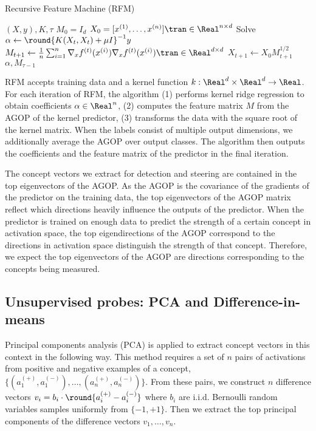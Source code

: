\begin{algorithm}[h]
\caption{Recursive Feature Machine (RFM) \citep{rfm_science}}\label{alg: RFM}
\begin{algorithmic}
\Require $(X, y), K, \tau$ 
\State $M_0 = I_{d}$
\State $X_0 = [x^{(1)},\ldots, x^{(n)}]\tran \in \Real^{n \times d}$
    \State Solve $\alpha \leftarrow \round{K(X_t,X_t) + \mu I}^{-1}y$ 
    \State $M_{t+1} \leftarrow \frac{1}{n}\sum_{i=1}^n \nabla_x f^{(t)}(x^{(i)}) \nabla_x f^{(t)}(x^{(i)})\tran \in \Real^{d \times d}$ 
    \State $X_{t+1} \leftarrow X_0 M^{1/2}_{t+1}$
\EndFor
\\\Return $\alpha, M_{\tau-1}$ 
\end{algorithmic}
\end{algorithm}

RFM accepts training data and a kernel function $k : \Real^{d} \times \Real^{d} \rightarrow \Real$. For each iteration of RFM, the algorithm (1) performs kernel ridge regression to obtain coefficients $\alpha \in \Real^n$, (2) computes the feature matrix $M$ from the AGOP of the kernel predictor, (3) transforms the data with the square root of the kernel matrix. When the labels consist of multiple output dimensions, we additionally average the AGOP over output classes. The algorithm then outputs the coefficients and the feature matrix of the predictor in the final iteration.

The concept vectors we extract for detection and steering are contained in the top eigenvectors of the AGOP. As the AGOP is the covariance of the gradients of the predictor on the training data, the top eigenvectors of the AGOP matrix reflect which directions heavily influence the outputs of the predictor. When the predictor is trained on enough data to predict the strength of a certain concept in activation space, the top eigendirections of the AGOP correspond to the directions in activation space distinguish the strength of that concept. Therefore, we expect the top eigenvectors of the AGOP are directions corresponding to the concepts being measured.

\subsection{Unsupervised probes: PCA and Difference-in-means} 
\label{app: pca}
Principal components analysis (PCA) is applied to extract concept vectors in this context in the following way. This method requires a set of $n$ pairs of activations from positive and negative examples of a concept, $\{(a^{(+)}_1,a^{(-)}_1),\ldots, (a^{(+)}_n,a^{(-)}_n)\}$. From these pairs, we construct $n$ difference vectors $v_i = b_i \cdot \round{a^{(+)}_i - a^{(-)}_i}$ where $b_i$ are i.i.d. Bernoulli random variables samples uniformly from $\{-1,+1\}$. Then we extract the top principal components of the difference vectors $v_1, \ldots, v_n$.

